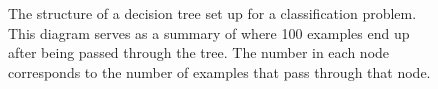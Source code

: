 \begin{figure}[ht]
  \centering
  \caption{The structure of a decision tree set up for a classification problem.
  This diagram serves as a summary of where 100 examples end up after being
  passed through the tree. The number in each node corresponds to the number of
  examples that pass through that node.}
  \label{fig:bdt}
\end{figure}

